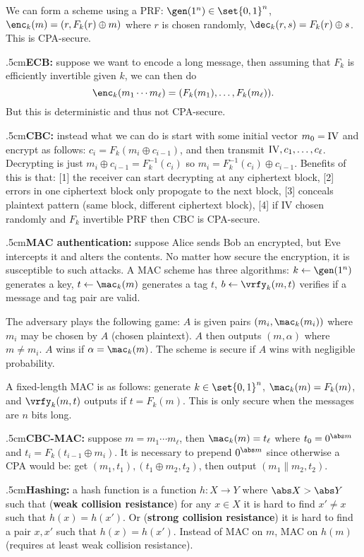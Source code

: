 We can form a scheme using a PRF: $\gen(1^n)\in\set{0,1}^n$, $\enc_k(m)=(r,F_k(r)\oplus m)$ where $r$ is chosen randomly, $\dec_k(r,s)=F_k(r)\oplus s$.
This is CPA-secure.

\quitvmode\kern.5cm{\bf ECB:} suppose we want to encode a long message, then assuming that $F_k$ is efficiently invertible given $k$, we can then do
$$ \enc_k(m_1\cdots m_\ell)=(F_k(m_1),\dots,F_k(m_\ell)) . $$
But this is deterministic and thus not CPA-secure.

\quitvmode\kern.5cm{\bf CBC:} instead what we can do is start with some initial vector $m_0={\rm IV}$ and encrypt as follows: $c_i=F_k(m_i\oplus c_{i-1})$, and then transmit ${\rm IV},c_1,\dots,c_\ell$.
Decrypting is just $m_i\oplus c_{i-1}=F_k^{-1}(c_i)$ so $m_i=F_k^{-1}(c_i)\oplus c_{i-1}$.
Benefits of this is that: [1] the receiver can start decrypting at any ciphertext block, [2] errors in one ciphertext block only propogate to the next block, [3] conceals plaintext pattern (same block,
different ciphertext block), [4] if {\rm IV} chosen randomly and $F_k$ invertible PRF then CBC is CPA-secure.

\quitvmode\kern.5cm{\bf MAC authentication:} suppose Alice sends Bob an encrypted, but Eve intercepts it and alters the contents.
No matter how secure the encryption, it is susceptible to such attacks.
A MAC scheme has three algorithms: $k\gets\gen(1^n)$ generates a key, $t\gets\mac_k(m)$ generates a tag $t$, $b\gets\vrfy_k(m,t)$ verifies if a message and tag pair are valid.

The adversary plays the following game: $A$ is given pairs $(m_i,\mac_k(m_i))$ where $m_i$ may be chosen by $A$ (chosen plaintext).
$A$ then outputs $(m,\alpha)$ where $m\neq m_i$.
$A$ wins if $\alpha=\mac_k(m)$.
The scheme is secure if $A$ wins with negligible probability.

A fixed-length MAC is as follows: generate $k\in\set{0,1}^n$, $\mac_k(m)=F_k(m)$, and $\vrfy_k(m,t)$ outputs if $t=F_k(m)$.
This is only secure when the messages are $n$ bits long.

\quitvmode\kern.5cm{\bf CBC-MAC:} suppose $m=m_1\cdots m_\ell$, then $\mac_k(m)=t_\ell$ where $t_0=0^{\abs m}$ and $t_i=F_k(t_{i-1}\oplus m_i)$.
It is necessary to prepend $0^{\abs m}$ since otherwise a CPA would be: get $(m_1,t_1),(t_1\oplus m_2,t_2)$, then output $(m_1\|m_2,t_2)$.

\quitvmode\kern.5cm{\bf Hashing:} a hash function is a function $h\colon X\to Y$ where $\abs X>\abs Y$ such that ({\bf weak collision resistance}) for any $x\in X$ it is hard to find $x'\neq x$ such that
$h(x)=h(x')$.
Or ({\bf strong collision resistance}) it is hard to find a pair $x,x'$ such that $h(x)=h(x')$.
Instead of MAC on $m$, MAC on $h(m)$ (requires at least weak collision resistance).

